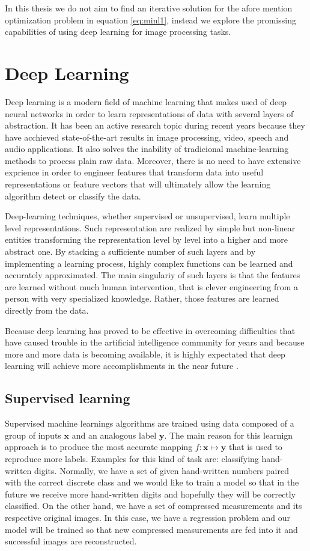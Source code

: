 In this thesis we do not aim to find an iterative solution for the afore mention optimization problem in equation \ref{eq:minl1}, instead we explore the promissing capabilities of using deep learning for image processing tasks.

   
\section{Deep Learning}
Deep learning is a modern field of machine learning that makes used of deep neural networks in order to learn representations of data with several layers of abstraction. It has been an active research topic during recent years because they have acchieved state-of-the-art results in image processing, video, speech and audio applications. It also solves the inability of tradicional machine-learning methods to process plain raw data. Moreover, there is no need to have extensive exprience in order to engineer features that transform data into useful representations or feature vectors that will ultimately allow the learning algorithm detect or classify the data. \

Deep-learning techniques, whether supervised or unsupervised, learn multiple level representations. Such representation are realized by simple but non-linear entities transforming the representation level by level into a higher and more abstract one. By stacking a sufficiente number of such layers and by implementing a learning process, highly complex functions can be learned and accurately approximated. The main singulariy of such layers is that the features are learned without much human intervention, that is clever engineering from a person with very specialized knowledge. Rather, those features are learned directly from the data.   \   

Because deep learning has proved to be effective in overcoming difficulties that have caused trouble in the artificial intelligence community for years and because more and more data is becoming available, it is highly expectated that deep learning will achieve more accomplishments in the near future \cite{lecun2015deep}.  

\subsection{Supervised learning} \label{sec:superv}
Supervised machine learnings algorithms are trained using data composed of a group of inputs $\mathbf{x}$ and an analogous label $\mathbf{y}$. The main reason for this learnign approach is to produce the most accurate mapping $f : \mathbf{x} \mapsto \mathbf{y} $ that is used to reproduce more labels. Examples for this kind of task are: classifying hand-written digits. Normally, we have a set of given hand-written numbers paired with the correct discrete class and we would like to train a model so that in the future we receive more hand-written digits and hopefully they will be correctly classified. On the other hand, we have a set of compressed measurements and its respective original images. In this case, we have a regression problem and our model will be trained so that new compressed measurements are fed into it and successful images are reconstructed.   

